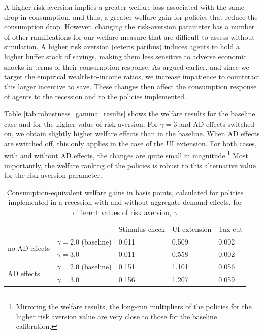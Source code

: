 \documentclass[\econtexRoot/HAFiscal]{subfiles}
\begin{document}
A higher risk aversion implies a greater welfare loss associated with the same drop in consumption, and thus, a greater welfare gain for policies that reduce the consumption drop. However, changing the risk-aversion parameter has a number of other ramifications for our welfare measure that are difficult to assess without simulation. A higher risk aversion (ceteris paribus) induces agents to hold a higher buffer stock of savings, making them less sensitive to adverse economic shocks in terms of their consumption response. As argued earlier, and since we target the empirical wealth-to-income ratios, we increase impatience to counteract this larger incentive to save. These changes then affect the consumption response of agents to the recession and to the policies implemented. 

Table \ref{tab:robustness_gamma_results} shows the welfare results for the baseline case and for the higher value of risk aversion. For $\gamma=3$ and AD effects switched on, we obtain slightly higher welfare effects than in the baseline. When AD effects are switched off, this only applies in the case of the UI extension. For both cases, with and without AD effects, the changes are quite small in magnitude.\footnote{Mirroring the welfare results, the long-run multipliers of the policies for the higher risk aversion value are very close to those for the baseline calibration.} Most importantly, the welfare ranking of the policies is robust to this alternative value for the risk-aversion parameter.

\begin{table}[]
  \begin{center}
    \begin{tabular}{@{}lllll@{}}
      \toprule
      &                    & Stimulus check & UI extension & Tax cut \\ \cmidrule(l){1-5} 
      \multirow{2}{*}{no AD effects}
      & $\gamma = 2.0$ (baseline) & 0.011          & 0.509        & 0.002   \\
      & $\gamma = 3.0$ 			& 0.011          & 0.558        & 0.002   \\ \cmidrule(l){1-5} 
      \multirow{2}{*}{AD effects}
      & $\gamma = 2.0$ (baseline) & 0.151          & 1.101        & 0.056   \\
      & $\gamma = 3.0$    		& 0.156          & 1.207        & 0.059   \\ \cmidrule(l){1-5} 
    \end{tabular}
    \caption{Consumption-equivalent welfare gains in basis points, calculated for policies implemented in a recession with and without aggregate demand effects, for different values of risk aversion, $\gamma$}
    \notinsubfile{\label{tab:robustness_gamma_results}}
  \end{center}
\end{table}
\end{document}
